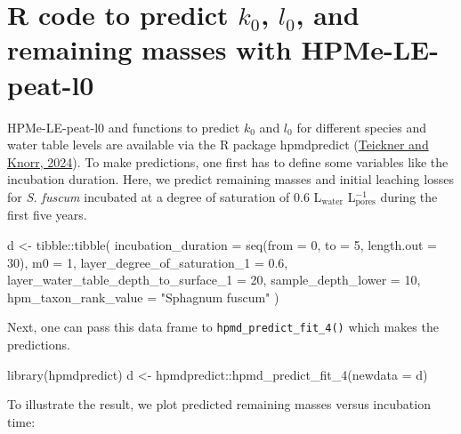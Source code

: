 \documentclass[
  12pt,
]{article}
\newenvironment{Shaded}{\begin{snugshade}}{\end{snugshade}}
\newcommand{\AttributeTok}[1]{\textcolor[rgb]{0.77,0.63,0.00}{#1}}
\newcommand{\DecValTok}[1]{\textcolor[rgb]{0.00,0.00,0.81}{#1}}
\newcommand{\FloatTok}[1]{\textcolor[rgb]{0.00,0.00,0.81}{#1}}
\newcommand{\FunctionTok}[1]{\textcolor[rgb]{0.00,0.00,0.00}{#1}}
\newcommand{\NormalTok}[1]{#1}
\newcommand{\OtherTok}[1]{\textcolor[rgb]{0.56,0.35,0.01}{#1}}
\newcommand{\SpecialCharTok}[1]{\textcolor[rgb]{0.00,0.00,0.00}{#1}}
\newcommand{\StringTok}[1]{\textcolor[rgb]{0.31,0.60,0.02}{#1}}
\begin{document}
\hypertarget{sup-7}{%
\section{\texorpdfstring{R code to predict \(k_0\), \(l_0\), and remaining masses with HPMe-LE-peat-l0}{R code to predict k\_0, l\_0, and remaining masses with HPMe-LE-peat-l0}}\label{sup-7}}

HPMe-LE-peat-l0 and functions to predict \(k_0\) and \(l_0\) for different species and water table levels are available via the R package hpmdpredict (\protect\hyperlink{ref-Teickner.2024b}{Teickner and Knorr, 2024}). To make predictions, one first has to define some variables like the incubation duration. Here, we predict remaining masses and initial leaching losses for \emph{S. fuscum} incubated at a degree of saturation of 0.6 L\(_\text{water}\) L\(_\text{pores}^{-1}\) during the first five years.

\begin{Shaded}
\begin{Highlighting}[]
\NormalTok{d }\OtherTok{\textless{}{-}} 
\NormalTok{  tibble}\SpecialCharTok{::}\FunctionTok{tibble}\NormalTok{(}
    \AttributeTok{incubation\_duration =} \FunctionTok{seq}\NormalTok{(}\AttributeTok{from =} \DecValTok{0}\NormalTok{, }\AttributeTok{to =} \DecValTok{5}\NormalTok{, }\AttributeTok{length.out =} \DecValTok{30}\NormalTok{),}
    \AttributeTok{m0 =} \DecValTok{1}\NormalTok{,}
    \AttributeTok{layer\_degree\_of\_saturation\_1 =} \FloatTok{0.6}\NormalTok{,}
    \AttributeTok{layer\_water\_table\_depth\_to\_surface\_1 =} \DecValTok{20}\NormalTok{,}
    \AttributeTok{sample\_depth\_lower =} \DecValTok{10}\NormalTok{,}
    \AttributeTok{hpm\_taxon\_rank\_value =} \StringTok{"Sphagnum fuscum"}
\NormalTok{  )}
\end{Highlighting}
\end{Shaded}

Next, one can pass this data frame to \texttt{hpmd\_predict\_fit\_4()} which makes the predictions.

\begin{Shaded}
\begin{Highlighting}[]
\FunctionTok{library}\NormalTok{(hpmdpredict)}
\NormalTok{d }\OtherTok{\textless{}{-}}\NormalTok{ hpmdpredict}\SpecialCharTok{::}\FunctionTok{hpmd\_predict\_fit\_4}\NormalTok{(}\AttributeTok{newdata =}\NormalTok{ d)}
\end{Highlighting}
\end{Shaded}

To illustrate the result, we plot predicted remaining masses versus incubation time:
\end{document}
